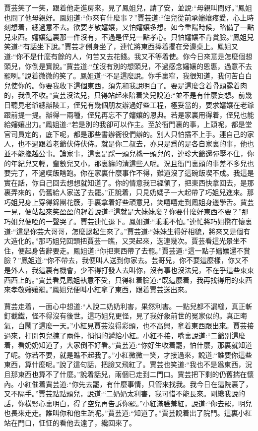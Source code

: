 \begin{parag}
    賈芸笑了一笑，跟着他走進房來，見了鳳姐兒，請了安，並說:“母親叫問好。”鳳姐也問了他母親好。鳳姐道:“你來有什麼事？”賈芸道:“侄兒從前承嬸孃疼愛，心上時刻想着，總過意不去。欲要孝敬嬸孃，又怕嬸孃多想。如今重陽時候，略備了一點兒東西。嬸孃這裏那一件沒有，不過是侄兒一點孝心。只怕嬸孃不肯賞臉。”鳳姐兒笑道:“有話坐下說。”賈芸才側身坐了，連忙將東西捧着擱在旁邊桌上。鳳姐又道:“你不是什麼有餘的人，何苦又去花錢。我又不等着使。你今日來意是怎麼個想頭兒，你倒是實說。”賈芸道:“並沒有別的想頭兒，不過感念嬸孃的恩惠，過意不去罷咧。”說着微微的笑了。鳳姐道:“不是這麼說。你手裏窄，我很知道，我何苦白白兒使你的。你要我收下這個東西，須先和我說明白了。要是這麼含着骨頭露着肉的，我倒不收。”賈芸沒法兒，只得站起來陪着笑兒說道:“並不是有什麼妄想。前幾日聽見老爺總辦陵工，侄兒有幾個朋友辦過好些工程，極妥當的，要求嬸孃在老爺跟前提一提。辦得一兩種，侄兒再忘不了嬸孃的恩典。若是家裏用得着，侄兒也能給嬸孃出力。”鳳姐道:“若是別的我卻可以作主。至於衙門裏的事，上頭呢，都是堂官司員定的，底下呢，都是那些書辦衙役們辦的。別人只怕插不上手。連自己的家人，也不過跟着老爺伏侍伏侍。就是你二叔去，亦只是爲的是各自家裏的事，他也並不能攙越公事。論家事，這裏是踩一頭兒橇一頭兒的，連珍大爺還彈壓不住，你的年紀兒又輕，輩數兒又小，那裏纏的清這些人呢。況且衙門裏頭的事差不多兒也要完了，不過喫飯瞎跑。你在家裏什麼事作不得，難道沒了這碗飯喫不成。我這是實在話，你自己回去想想就知道了。你的情意我已經領了，把東西快拿回去，是那裏弄來的，仍舊給人家送了去罷。”正說着，只見奶媽子一大起帶了巧姐兒進來。那巧姐兒身上穿得錦團花簇，手裏拿着好些頑意兒，笑嘻嘻走到鳳姐身邊學舌。賈芸一見，便站起來笑盈盈的趕着說道:“這就是大妹妹麼？你要什麼好東西不要？”那巧姐兒便啞的一聲哭了。賈芸連忙退下。鳳姐道:“乖乖不怕。”連忙將巧姐攬在懷裏道:“這是你芸大哥哥，怎麼認起生來了。”賈芸道:“妹妹生得好相貌，將來又是個有大造化的。”那巧姐兒回頭把賈芸一瞧，又哭起來，迭連幾次。賈芸看這光景坐不住，便起身告辭要走。鳳姐道:“你把東西帶了去罷。”賈芸道:“這一點子嬸孃還不賞臉？”鳳姐道:“你不帶去，我便叫人送到你家去。芸哥兒，你不要這麼樣，你又不是外人，我這裏有機會，少不得打發人去叫你，沒有事也沒法兒，不在乎這些東東西西上的。”賈芸看見鳳姐執意不受，只得紅着臉道:“既這麼着，我再找得用的東西來孝敬嬸孃罷。”鳳姐兒便叫小紅拿了東西，跟着賈芸送出來。
\end{parag}


\begin{parag}
    賈芸走着，一面心中想道:“人說二奶奶利害，果然利害。一點兒都不漏縫，真正斬釘截鐵，怪不得沒有後世。這巧姐兒更怪，見了我好象前世的冤家似的。真正晦氣，白鬧了這麼一天。”小紅見賈芸沒得彩頭，也不高興，拿着東西跟出來。賈芸接過來，打開包兒揀了兩件，悄悄的遞給小紅。小紅不接，嘴裏說道:“二爺別這麼着，看奶奶知道了，大家倒不好看。”賈芸道:“你好生收着罷，怕什麼，那裏就知道了呢。你若不要，就是瞧不起我了。”小紅微微一笑，才接過來，說道:“誰要你這些東西，算什麼呢。”說了這句話，把臉又飛紅了。賈芸也笑道:“我也不是爲東西，況且那東西也算不了什麼。”說着話兒，兩個已走到二門口。賈芸把下剩的仍舊揣在懷內。小紅催着賈芸道:“你先去罷，有什麼事情，只管來找我。我今日在這院裏了，又不隔手。”賈芸點點頭兒，說道:“二奶奶太利害，我可惜不能長來。剛纔我說的話，你橫豎心裏明白，得了空兒再告訴你罷。”小紅滿臉羞紅，說道:“你去罷，明兒也長來走走。誰叫你和他生疏呢。”賈芸道:“知道了。”賈芸說着出了院門。這裏小紅站在門口，怔怔的看他去遠了，纔回來了。
\end{parag}


